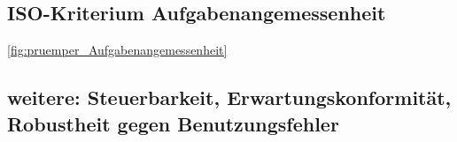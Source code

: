 


\subsection*{ISO-Kriterium Aufgabenangemessenheit}
\autoref{fig:pruemper_Aufgabenangemessenheit}
\subsection*{weitere: Steuerbarkeit, Erwartungskonformität, Robustheit gegen Benutzungsfehler}
